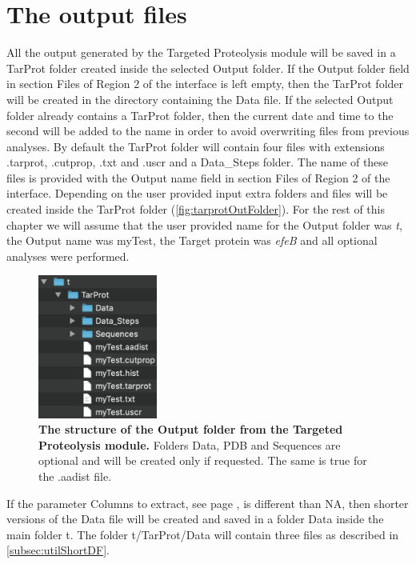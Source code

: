 \section{The output files}

All the output generated by the Targeted Proteolysis module will be saved in a TarProt folder created inside the selected Output folder. If the Output folder field in section Files of Region \num{2} of the interface is left empty, then the TarProt folder will be created in the directory containing the Data file. If the selected Output folder already contains a TarProt folder, then the current date and time to the second will be added to the name in order to avoid overwriting files from previous analyses. By default the TarProt folder will contain four files with extensions .tarprot, .cutprop, .txt and .uscr and a Data{\_}Steps folder. The name of these files is provided with the Output name field in section Files of Region \num{2} of the interface. Depending on the user provided input extra folders and files will be created inside the TarProt folder (\autoref{fig:tarprotOutFolder}). For the rest of this chapter we will assume that the user provided name for the Output folder was \textit{t}, the Output name was myTest, the Target protein was \textit{efeB} and all optional analyses were performed.

\begin{figure}[h]
	\centering
	\includegraphics[width=0.35\textwidth]{./IMAGES/MOD-TARPROT/tarprot-files.jpg}	    
	\caption[The structure of the Output folder from the Targeted Proteolysis module]{\textbf{The structure of the Output folder from the Targeted Proteolysis module.} Folders Data, PDB and Sequences are optional and will be created only if requested. The same is true for the .aadist file.} 
	\label{fig:tarprotOutFolder}
	\vspace{-5pt} 	
\end{figure} 

If the parameter Columns to extract, see page \pageref{par:tarprotColExt}, is different than NA, then shorter versions of the Data file will be created and saved in a folder Data inside the main folder t. The folder t/TarProt/Data will\label{par:tarprotDataFiles} contain three files as described in \autoref{subsec:utilShortDF}.

